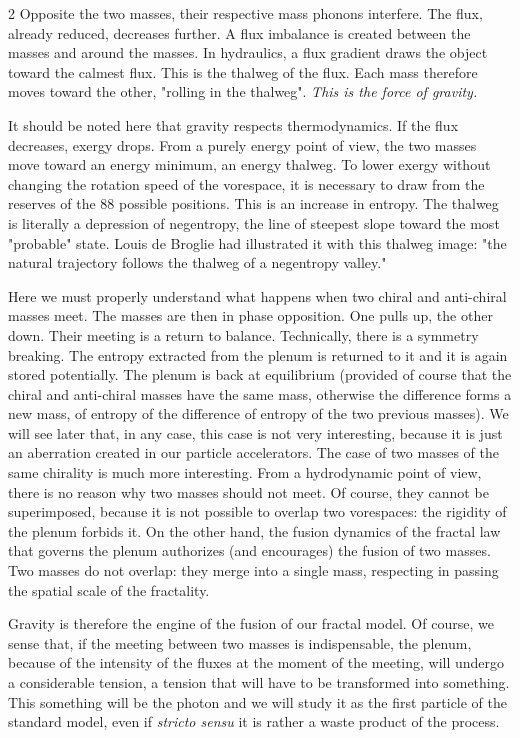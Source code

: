 \begin{multicols}{2}
	Opposite the two masses, their respective mass phonons interfere. The 
	flux, already reduced, decreases further. A flux imbalance is created 
	between the masses and around the masses. In hydraulics, a flux 
	gradient draws the object toward the calmest flux. This is the thalweg 
	of the flux. Each mass therefore moves toward the other, "rolling in the 
	thalweg". \textit{This is the force of gravity.}
	
	It should be noted here that gravity respects thermodynamics. If the flux 
	decreases, exergy drops. From a purely energy point of view, the two 
	masses move toward an energy minimum, an energy thalweg. To lower 
	exergy without changing the rotation speed of the vorespace, it is 
	necessary to draw from the reserves of the 88 possible positions. This is 
	an increase in entropy. The thalweg is literally a depression of 
	negentropy, the line of steepest slope toward the most "probable" 
	state. Louis de Broglie had illustrated it with this thalweg image: "the 
	natural trajectory follows the thalweg of a negentropy valley." 
	\cite{debroglie1964thermodynamique}
	
	Here we must properly understand what happens when two chiral and 
	anti-chiral masses meet. The masses are then in phase opposition. One 
	pulls up, the other down. Their meeting is a return to balance. 
	Technically, there is a symmetry breaking. The entropy extracted from 
	the plenum is returned to it and it is again stored potentially. The 
	plenum is back at equilibrium (provided of course that the chiral and 
	anti-chiral masses have the same mass, otherwise the difference forms a 
	new mass, of entropy of the difference of entropy of the two previous 
	masses). We will see later that, in any case, this case is not very 
	interesting, because it is just an aberration created in our particle 
	accelerators. The case of two masses of the same chirality is much more 
	interesting. From a hydrodynamic point of view, there is no reason why 
	two masses should not meet. Of course, they cannot be superimposed, 
	because it is not possible to overlap two vorespaces: the rigidity of the 
	plenum forbids it. On the other hand, the fusion dynamics of the 
	fractal law that governs the plenum authorizes (and encourages) the 
	fusion of two masses. Two masses do not overlap: they merge into a 
	single mass, respecting in passing the spatial scale of the fractality.
	
	Gravity is therefore the engine of the fusion of our fractal model. Of 
	course, we sense that, if the meeting between two masses is 
	indispensable, the plenum, because of the intensity of the fluxes at 
	the moment of the meeting, will undergo a considerable tension, a 
	tension that will have to be transformed into something. This something 
	will be the photon and we will study it as the first particle of the 
	standard model, even if \textit{stricto sensu} it is rather a waste 
	product of the process.
	

\end{multicols}

